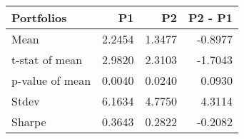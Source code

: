 \begin{tabular}{lrrr}
\toprule
Portfolios & P1 & P2 & P2 - P1 \\
\midrule
Mean & 2.2454 & 1.3477 & -0.8977 \\
t-stat of mean & 2.9820 & 2.3103 & -1.7043 \\
p-value of mean & 0.0040 & 0.0240 & 0.0930 \\
Stdev & 6.1634 & 4.7750 & 4.3114 \\
Sharpe & 0.3643 & 0.2822 & -0.2082 \\
\bottomrule
\end{tabular}
